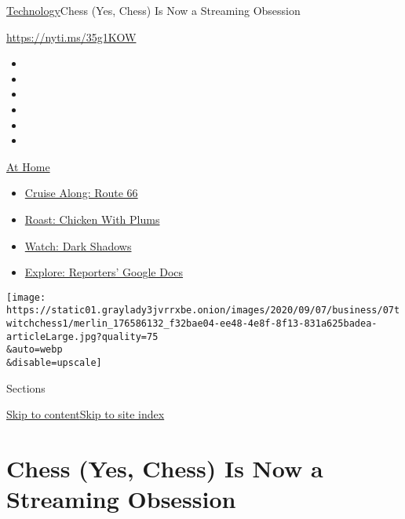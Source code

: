 \href{/section/technology}{Technology}\textbar{}Chess (Yes, Chess) Is
Now a Streaming Obsession

\url{https://nyti.ms/35g1KOW}

\begin{itemize}
\item
\item
\item
\item
\item
\item
\end{itemize}

\href{https://www.nytimes3xbfgragh.onion/spotlight/at-home?action=click\&pgtype=Article\&state=default\&region=TOP_BANNER\&context=at_home_menu}{At
Home}

\begin{itemize}
\tightlist
\item
  \href{https://www.nytimes3xbfgragh.onion/2020/09/07/travel/route-66.html?action=click\&pgtype=Article\&state=default\&region=TOP_BANNER\&context=at_home_menu}{Cruise
  Along: Route 66}
\item
  \href{https://www.nytimes3xbfgragh.onion/2020/09/04/dining/sheet-pan-chicken.html?action=click\&pgtype=Article\&state=default\&region=TOP_BANNER\&context=at_home_menu}{Roast:
  Chicken With Plums}
\item
  \href{https://www.nytimes3xbfgragh.onion/2020/09/04/arts/television/dark-shadows-stream.html?action=click\&pgtype=Article\&state=default\&region=TOP_BANNER\&context=at_home_menu}{Watch:
  Dark Shadows}
\item
  \href{https://www.nytimes3xbfgragh.onion/interactive/2020/at-home/even-more-reporters-editors-diaries-lists-recommendations.html?action=click\&pgtype=Article\&state=default\&region=TOP_BANNER\&context=at_home_menu}{Explore:
  Reporters' Google Docs}
\end{itemize}

\texttt{[image: https://static01.graylady3jvrrxbe.onion/images/2020/09/07/business/07twitchchess1/merlin\_176586132\_f32bae04-ee48-4e8f-8f13-831a625badea-articleLarge.jpg?quality=75\\\&auto=webp\\\&disable=upscale]}

Sections

\protect\hyperlink{site-content}{Skip to
content}\protect\hyperlink{site-index}{Skip to site index}

\hypertarget{chess-yes-chess-is-now-a-streaming-obsession}{%
\section{Chess (Yes, Chess) Is Now a Streaming
Obsession}\label{chess-yes-chess-is-now-a-streaming-obsession}}

